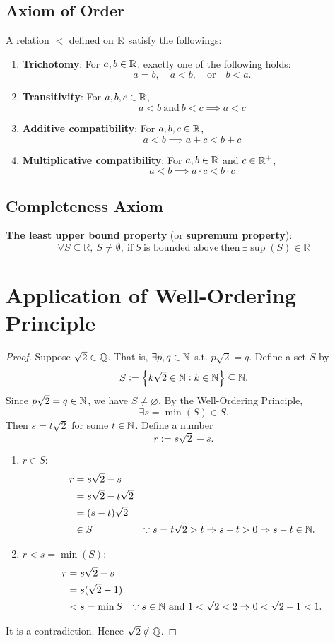 \documentclass[11pt,openany]{article}
\begin{document}
\subsection{Axiom of Order}
A relation $<$ defined on $\mathbb{R}$ satisfy the followings:
\begin{enumerate}
	\item \hypertarget{trichotomy}{\textbf{Trichotomy}: 
	For $a,b\in\mathbb{R}$, \underline{exactly one} of the following holds: \[
	a=b,\quad a < b,\quad \text{or}\quad b < a.
	\]}
	\item \textbf{Transitivity}: For $a,b,c\in\mathbb{R}$,
	\[a < b \ \text{and} \ b < c \implies a < c\]
	\item \textbf{Additive compatibility}: For $a,b,c\in\mathbb{R}$,
	\[a < b \implies a + c < b + c\]
	\item \textbf{Multiplicative compatibility}: For $a,b\in\mathbb{R}$ and $c\in\mathbb{R}^+$,
	\[a < b \implies a \cdot c < b \cdot c\]
\end{enumerate}
\vspace{20pt}
\subsection{Completeness Axiom}
\textbf{The least upper bound property} (or \textbf{supremum property}): 
\[
\forall S\subseteq \mathbb{R}, \ S \neq \emptyset, \ \text{if} \ S \ \text{is bounded above}\ \text{then}\ \exists \sup(S) \in \mathbb{R}
\]

\newpage
\section{Application of Well-Ordering Principle}
\begin{proof}
	Suppose $\sqrt{2}\in\mathbb{Q}$. That is, $\exists p,q\in\mathbb{N}$ s.t. $p\sqrt{2}=q$. Define a set $S$ by \[
	S:=\set{k\sqrt{2}\in\mathbb{N}:k\in\mathbb{N}}\subseteq\mathbb{N}.
	\] Since $p\sqrt{2}=q\in\mathbb{N}$, we have $S\neq\varnothing$. By the Well-Ordering Principle, \[
	\exists s=\min (S)\in S.
	\] Then $s=t\sqrt{2}$ for some $t\in\mathbb{N}$. Define a number \[
	r:=s\sqrt{2}-s.
	\] \begin{enumerate}
		\item $r\in S$: \begin{align*}
			r&=s\sqrt{2}-s\\
			&=s\sqrt{2}-t\sqrt{2}\\
			&=(s-t)\sqrt{2}\\
			&\in S &\because s=t\sqrt{2}>t\Rightarrow s-t>0\Rightarrow s-t\in\mathbb{N}.
		\end{align*}
		\item $r<s = \min(S)$: \begin{align*}
			r&=s\sqrt{2}-s\\
			&=s(\sqrt{2}-1)\\
			&<s=\min S &\because s\in\N\ \text{and}\ 1<\sqrt{2}<2\Rightarrow 0<\sqrt{2}-1<1.
		\end{align*}
	\end{enumerate}
	It is a contradiction. Hence $\sqrt{2}\notin\mathbb{Q}$.
\end{proof}
\newpage
\end{document}
